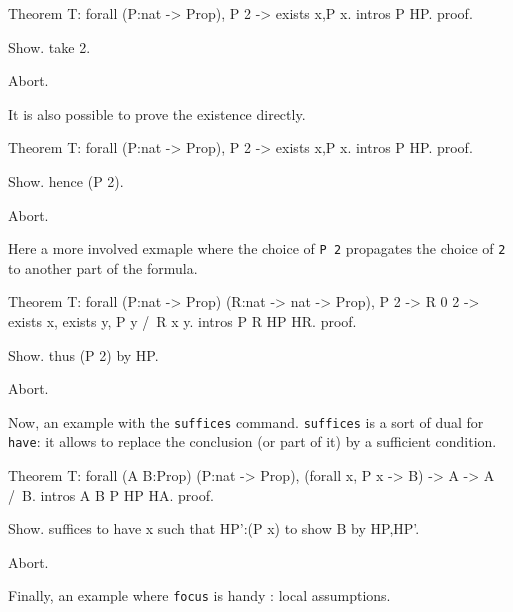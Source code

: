\begin{coq_eval}
Theorem T: forall (P:nat -> Prop), P 2 -> exists x,P x.
intros P HP.
proof.
\end{coq_eval} 
\begin{coq_example}
Show.
take 2.
\end{coq_example}
\begin{coq_eval}
Abort.
\end{coq_eval}

It is also possible to prove the existence directly.

\begin{coq_eval}
Theorem T: forall (P:nat -> Prop), P 2 -> exists x,P x.
intros P HP.
proof.
\end{coq_eval} 
\begin{coq_example}
Show.
hence (P 2).
\end{coq_example}
\begin{coq_eval}
Abort.
\end{coq_eval}

Here a more involved exmaple where the choice of {\tt P 2} propagates
the choice of {\tt 2} to another part of the formula.

\begin{coq_eval}
Theorem T: forall (P:nat -> Prop) (R:nat -> nat -> Prop), P 2 -> R 0 2 -> exists x, exists y, P y /\ R x y.
intros P R HP HR.
proof.
\end{coq_eval} 
\begin{coq_example}
Show.
thus (P 2) by HP.
\end{coq_example}
\begin{coq_eval}
Abort.
\end{coq_eval}

Now, an example with the {\tt suffices} command. {\tt suffices}
is a sort of dual for {\tt have}: it allows to replace the conclusion
(or part of it) by a sufficient condition. 

\begin{coq_eval}
Theorem T: forall (A B:Prop) (P:nat -> Prop), (forall x, P x -> B) -> A -> A /\ B.
intros A B P HP HA.
proof.
\end{coq_eval} 
\begin{coq_example}
Show.
suffices to have x such that HP':(P x) to show B by HP,HP'.
\end{coq_example}
\begin{coq_eval}
Abort.
\end{coq_eval}

Finally, an example where {\tt focus} is handy : local assumptions.  

